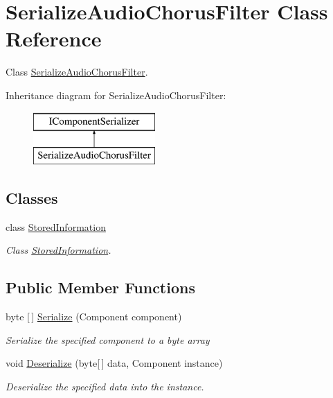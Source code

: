 \hypertarget{class_serialize_audio_chorus_filter}{}\section{Serialize\+Audio\+Chorus\+Filter Class Reference}
\label{class_serialize_audio_chorus_filter}


Class \hyperlink{class_serialize_audio_chorus_filter}{Serialize\+Audio\+Chorus\+Filter}.  


Inheritance diagram for Serialize\+Audio\+Chorus\+Filter\+:\begin{figure}[H]
\begin{center}
\leavevmode
\includegraphics[height=2.000000cm]{class_serialize_audio_chorus_filter}
\end{center}
\end{figure}
\subsection*{Classes}
\begin{DoxyCompactItemize}
\item 
class \hyperlink{class_serialize_audio_chorus_filter_1_1_stored_information}{Stored\+Information}
\begin{DoxyCompactList}\small\item\em Class \hyperlink{class_serialize_audio_chorus_filter_1_1_stored_information}{Stored\+Information}. \end{DoxyCompactList}\end{DoxyCompactItemize}
\subsection*{Public Member Functions}
\begin{DoxyCompactItemize}
\item 
byte \mbox{[}$\,$\mbox{]} \hyperlink{class_serialize_audio_chorus_filter_a1cedba3237b73240c2fb96f8831dc834}{Serialize} (Component component)
\begin{DoxyCompactList}\small\item\em Serialize the specified component to a byte array \end{DoxyCompactList}\item 
void \hyperlink{class_serialize_audio_chorus_filter_a2e5e9eeee7a3053843911ddd0ca0ae00}{Deserialize} (byte\mbox{[}$\,$\mbox{]} data, Component instance)
\begin{DoxyCompactList}\small\item\em Deserialize the specified data into the instance. \end{DoxyCompactList}\end{DoxyCompactItemize}


